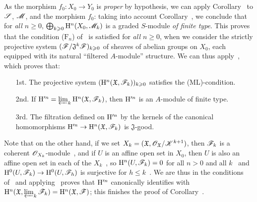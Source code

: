 As the morphism $f_0:X_0\to Y_0$ is \emph{proper} by hypothesis, we can apply Corollary~ to $\mathscr{S}$, $\mathscr{M}$, and the morphism $f_0$: taking into account Corollary~, we conclude that for \emph{all $n\geq 0$}, $\bigoplus_{k\geqslant 0}\mathrm{H}^n(X_0,\mathscr{M}_k)$ is a graded $S$-module \emph{of finite type}.
This proves that the condition ($\text{F}_n$) of~ is satisfied for \emph{all $n\geq 0$}, when we consider the strictly projective system $(\mathscr{F}/\mathfrak{J}^k\mathscr{F})_{k\geqslant 0}$ of sheaves of abelian groups on $X_0$, each equipped with its natural ``filtered $A$-module'' structure.
We can thus apply~, which proves that:
\begin{enumerate}
  \item[1st.] The projective system $(\mathrm{H}^n(\mathfrak{X},\mathscr{F}_k))_{k\geqslant 0}$ satisfies the (ML)-condition.
  \item[2nd.] If $\mathrm{H}^{\prime n}=\varprojlim_k\mathrm{H}^n(\mathfrak{X},\mathscr{F}_k)$, then $\mathrm{H}^{\prime n}$ is an $A$-module of finite type.
  \item[3rd.] The filtration defined on $\mathrm{H}^{\prime n}$ by the kernels of the canonical homomorphisms $\HH^{\prime n}\to\HH^n(\mathfrak{X},\sh{F}_k)$ is $\mathfrak{J}$-good.
\end{enumerate}

Note that on the other hand, if we set $X_k=(\mathfrak{X},\mathscr{O}_\mathfrak{X}/\mathscr{K}^{k+1})$, then $\mathscr{F}_k$ is a coherent $\mathscr{O}_{X_k}$-module~, and if $U$ is an affine open set in $X_0$, then $U$ is also an affine open set in each of the $X_k$~, so $\mathrm{H}^n(U,\mathscr{F}_k)=0$ for all $n>0$ and all $k$~ and $\HH^0(U,\sh{F}_k)\to\HH^0(U,\sh{F}_h)$ is surjective for $h\leq k$~.
We are thus in the conditions of~ and applying~ proves that $\mathrm{H}^{\prime n}$ canonically identifies with $\mathrm{H}^n(\mathfrak{X},\varprojlim_k\mathscr{F}_k)=\mathrm{H}^n(\mathfrak{X},\mathscr{F})$; this finishes the proof of Corollary~.

